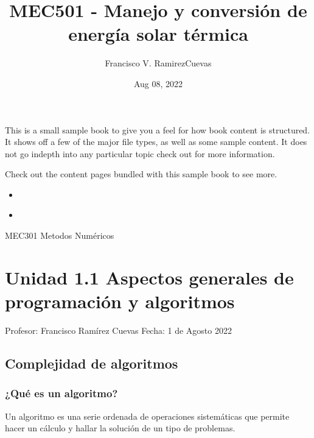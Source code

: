 \documentclass[letterpaper,10pt,english]{jupyterBook}
\title{MEC501 - Manejo y conversión de energía solar térmica}
\date{Aug 08, 2022}
\author{Francisco V.\@{} Ramirez\sphinxhyphen{}Cuevas}
\begin{document}
\pagestyle{empty}
\sphinxmaketitle
\pagestyle{plain}
\sphinxtableofcontents
\pagestyle{normal}
\label{\detokenize{intro::doc}}


\sphinxAtStartPar
This is a small sample book to give you a feel for how book content is
structured.
It shows off a few of the major file types, as well as some sample content.
It does not go in\sphinxhyphen{}depth into any particular topic \sphinxhyphen{} check out  for more information.

\sphinxAtStartPar
Check out the content pages bundled with this sample book to see more.
\begin{itemize}
\item {} 
\sphinxAtStartPar
{\hyperref[\detokenize{1.1-Aspectos_generales/1.1-Aspectos_generales::doc}]{}}

\item {} 
\sphinxAtStartPar
{\hyperref[\detokenize{1.2-Algebra_lineal/1.2-Algebra_lineal::doc}]{}}

\end{itemize}

\sphinxstepscope

\sphinxAtStartPar
MEC301 \sphinxhyphen{} Metodos Numéricos


\chapter{Unidad 1.1 Aspectos generales de programación y algoritmos}
\label{\detokenize{1.1-Aspectos_generales/1.1-Aspectos_generales:unidad-1-1-br-aspectos-generales-de-programacion-y-algoritmos}}\label{\detokenize{1.1-Aspectos_generales/1.1-Aspectos_generales::doc}}
\sphinxAtStartPar

Profesor: Francisco Ramírez Cuevas
Fecha: 1 de Agosto 2022




\section{Complejidad de algoritmos}
\label{\detokenize{1.1-Aspectos_generales/1.1-Aspectos_generales:complejidad-de-algoritmos}}

\subsection{¿Qué es un algoritmo?}
\label{\detokenize{1.1-Aspectos_generales/1.1-Aspectos_generales:que-es-un-algoritmo}}
\sphinxAtStartPar
Un algoritmo es una serie ordenada de operaciones sistemáticas que permite hacer un cálculo y hallar la solución de un tipo de problemas.
\end{document}
